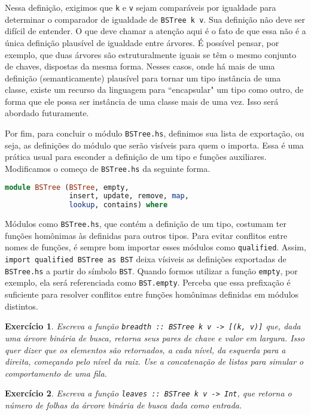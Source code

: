 \documentclass[a4paper]{article}
\newtheorem{exercicio}{Exercício}
\begin{document}
Nessa definição, exigimos que \texttt{k} e \texttt{v} sejam comparáveis por igualdade para determinar o comparador de igualdade de \texttt{BSTree k v}.
Sua definição não deve ser difícil de entender.
O que deve chamar a atenção aqui é o fato de que essa não é a única definição plausível de igualdade entre árvores.
É possível pensar, por exemplo, que duas árvores são estruturalmente iguais se têm o mesmo conjunto de chaves, dispostas da mesma forma.
Nesses casos, onde há mais de uma definição (semanticamente) plausível para tornar um tipo instância de uma classe, existe um recurso da linguagem para ``encapsular" um tipo como outro, de forma que ele possa ser instância de uma classe mais de uma vez.
Isso será abordado futuramente.

Por fim, para concluir o módulo \texttt{BSTree.hs}, definimos sua lista de exportação, ou seja, as definições do módulo que serão visíveis para quem o importa.
Essa é uma prática usual para esconder a definição de um tipo e funções auxiliares.
Modificamos o começo de \texttt{BSTree.hs} da seguinte forma.

\begin{lstlisting}[language=haskell, frame=single]
module BSTree (BSTree, empty,
               insert, update, remove, map,
               lookup, contains) where
\end{lstlisting}

Módulos como \texttt{BSTree.hs}, que contém a definição de um tipo, costumam ter funções homônimas às definidas para outros tipos.
Para evitar conflitos entre nomes de funções, é sempre bom importar esses módulos como \texttt{qualified}.
Assim, \mbox{\texttt{import qualified BSTree as BST}} deixa vísiveis as definições exportadas de \texttt{BSTree.hs} a partir do símbolo \texttt{BST}.
Quando formos utilizar a função \texttt{empty}, por exemplo, ela será referenciada como \texttt{BST.empty}.
Perceba que essa prefixação é suficiente para resolver conflitos entre funções homônimas definidas em módulos distintos.

\begin{exercicio}
	Escreva a função \emph{\texttt{breadth :: BSTree k v -> [(k, v)]}} que, dada uma árvore binária de busca, retorna seus pares de chave e valor em largura.
	Isso quer dizer que os elementos são retornados, a cada nível, da esquerda para a direita, começando pelo nível da raiz.
	Use a concatenação de listas para simular o comportamento de uma fila.
\end{exercicio}

\begin{exercicio}
	Escreva a função \emph{\texttt{leaves :: BSTree k v -> Int}}, que retorna o número de folhas da árvore binária de busca dada como entrada.
\end{exercicio}
\end{document}
